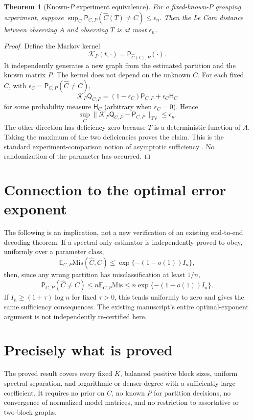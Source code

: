 \documentclass[11pt]{article}
\newtheorem{theorem}{Theorem}
\newcommand{\PP}{\mathsf P}
\newcommand{\QQ}{\mathsf Q}
\newcommand{\EE}{\mathbb E}
\newcommand{\TV}{\mathrm{TV}}
\newcommand{\Mis}{\mathrm{Mis}}
\begin{document}
\begin{theorem}[Known-$P$ experiment equivalence]\label{thm:lecam}
For a fixed-known-$P$ grouping experiment, suppose
$\sup_C\PP_{C,P}(\widehat C(T)\ne C)\le\epsilon_n$.
Then the Le Cam distance between observing $A$ and observing $T$ is at
most $\epsilon_n$.
\end{theorem}
\begin{proof}
Define the Markov kernel
\[
 \mathcal K_P(t,\cdot)=\PP_{\widehat C(t),P}(\cdot).
\]
It independently generates a new graph from the estimated partition and
the known matrix $P$. The kernel does not depend on the unknown $C$.
For each fixed $C$, with $\epsilon_C=\PP_{C,P}(\widehat C\ne C)$,
\[
 \mathcal K_P\QQ_{C,P}
 =(1-\epsilon_C)\PP_{C,P}+\epsilon_C\mathsf H_C
\]
for some probability measure $\mathsf H_C$ (arbitrary when $\epsilon_C=0$).
Hence
\[
 \sup_C\|\mathcal K_P\QQ_{C,P}-\PP_{C,P}\|_{\TV}\le\epsilon_n.
\]
The other direction has deficiency zero because $T$ is a deterministic
function of $A$. Taking the maximum of the two deficiencies proves the
claim. This is the standard experiment-comparison notion of asymptotic
sufficiency \cite{han}. No randomization of the parameter has occurred.
\end{proof}

\section{Connection to the optimal error exponent}
The following is an implication, not a new verification of an existing
end-to-end decoding theorem. If a spectral-only estimator is independently
proved to obey, uniformly over a parameter class,
\[
 \EE_{C,P}\Mis(\widehat C,C)
 \le\exp\{-(1-o(1))I_n\},
\]
then, since any wrong partition has misclassification at least $1/n$,
\[
 \PP_{C,P}(\widehat C\ne C)
 \le n\EE_{C,P}\Mis
 \le n\exp\{-(1-o(1))I_n\}.
\]
If $I_n\ge(1+\tau)\log n$ for fixed $\tau>0$, this tends uniformly to zero
and gives the same sufficiency consequences. The existing manuscript's
entire optimal-exponent argument is not independently re-certified here.

\section{Precisely what is proved}
The proved result covers every fixed $K$, balanced positive block sizes,
uniform spectral separation, and logarithmic or denser degree with a
sufficiently large coefficient. It requires no prior on $C$, no known $P$
for partition decisions, no convergence of normalized model matrices,
and no restriction to assortative or two-block graphs.
\end{document}
